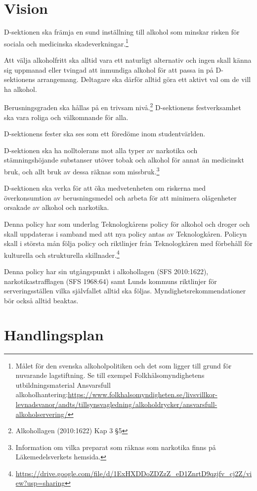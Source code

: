 \documentclass[]{dsekprotokoll}
\begin{document}
\section{Vision}
D-sektionen ska främja en sund inställning till alkohol som minskar risken för sociala och
medicinska skadeverkningar.\footnote{Målet för den svenska alkoholpolitiken och det som ligger till grund för nuvarande lagstiftning. Se till exempel Folkhälsomyndighetens utbildningsmaterial Ansvarsfull alkoholhantering:\url{https://www.folkhalsomyndigheten.se/livsvillkor-levnadsvanor/andts/tillsynsvagledning/alkoholdrycker/ansvarsfull-alkoholservering/}
}

Att välja alkoholfritt ska alltid vara ett naturligt alternativ och ingen skall känna sig uppmanad eller tvingad att inmundiga alkohol för att passa in på D-sektionens arrangemang. Deltagare ska därför alltid göra ett aktivt val om de vill ha alkohol.

Berusningsgraden ska hållas på en trivsam nivå.\footnote{Alkohollagen (2010:1622) Kap 3 §5} D-sektionens festverksamhet ska vara
roliga och välkomnande för alla.

D-sektionens fester ska ses som ett föredöme inom studentvärlden.

D-sektionen ska ha nolltolerans mot alla typer av narkotika och stämningshöjande substanser utöver tobak och alkohol för annat än medicinskt bruk, och allt bruk av dessa räknas som missbruk.\footnote{Information om vilka preparat som räknas som narkotika finns på Läkemedelsverkets hemsida.}

D-sektionen ska verka för att öka medvetenheten om riskerna med överkonsumtion av
berusningsmedel och arbeta för att minimera olägenheter orsakade av alkohol och narkotika.

Denna policy har som underlag Teknologkårens policy för alkohol och droger och skall uppdateras i samband med att nya policy antas av Teknologkåren. Policyn skall i största mån följa policy och riktlinjer från Teknologkåren med förbehåll för kulturella och strukturella skillnader.\footnote{\url{https://drive.google.com/file/d/1ExHXDDoZDZzZ_eD1ZnrtD9qzjfv_cj2Z/view?usp=sharing}}

Denna policy har sin utgångspunkt i alkohollagen (SFS 2010:1622), narkotikastrafflagen
(SFS 1968:64) samt Lunds kommuns riktlinjer för serveringsställen vilka självfallet alltid ska
följas. Myndighetsrekommendationer bör också alltid beaktas.

\section{Handlingsplan}
\end{document}
